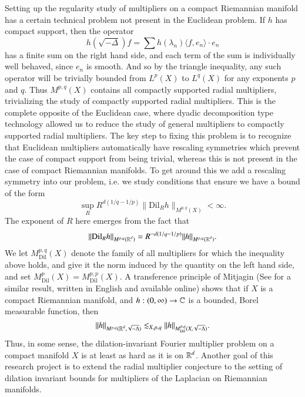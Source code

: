 Setting up the regularity study of multipliers on a compact Riemannian manifold has a certain technical problem not present in the Euclidean problem. If $h$ has compact support, then the operator
%
\[ h \left( \sqrt{-\Delta} \right) f = \sum h(\lambda_n) \langle f, e_n \rangle \cdot e_n \]
%
has a finite sum on the right hand side, and each term of the sum is individually well behaved, since $e_n$ is smooth. And so by the triangle inequality, any such operator will be trivially bounded from $L^p(X)$ to $L^q(X)$ for any exponents $p$ and $q$. Thus $M^{p,q}(X)$ contains all compactly supported radial multipliers, trivializing the study of compactly supported radial multipliers. This is the complete opposite of the Euclidean case, where dyadic decomposition type technology allowed us to reduce the study of general multipliers to compactly supported radial multipliers. The key step to fixing this problem is to recognize that Euclidean multipliers automatically have rescaling symmetries which prevent the case of compact support from being trivial, whereas this is not present in the case of compact Riemannian manifolds. To get around this we add a rescaling symmetry into our problem, i.e. we study conditions that ensure we have a bound of the form
%
\[ \sup_R R^{d(1/q - 1/p)} \| \text{Dil}_R h \|_{M^{p,q}(X)} < \infty. \]
%
The exponent of $R$ here emerges from the fact that
%
\[ \| \text{Dil}_R h \|_{M^{p,q}(\operatorname{\mathbb{R}}^d)} = R^{-d(1/q - 1/p)} \| h \|_{M^{p,q}(\operatorname{\mathbb{R}}^d)}. \]
%
We let $M^{p,q}_{\text{Dil}}(X)$ denote the family of all multipliers for which the inequality above holds, and give it the norm induced by the quantity on the left hand side, and set $M^p_{\text{Dil}}(X) = M^{p,p}_{\text{Dil}}(X)$. A transference principle of Mitjagin \cite{Mitjagin} (See \cite{KenigStantonTomas} for a similar result, written in English and available online) shows that if $X$ is a compact Riemannian manifold, and $h: (0,\infty) \to \operatorname{\mathbb{C}}$ is a bounded, Borel measurable function, then
%
\[ \| h \|_{M^{p,q}(\operatorname{\mathbb{R}}^d, \sqrt{-\Delta})} \lesssim_{X,p,q} \| h \|_{M^{p,q}_{\text{Dil}}(X, \sqrt{-\Delta})}. \]
%
Thus, in some sense, the dilation-invariant Fourier multiplier problem on a compact manifold $X$ is at least as hard as it is on $\operatorname{\mathbb{R}}^d$. Another goal of this research project is to extend the radial multiplier conjecture to the setting of dilation invariant bounds for multipliers of the Laplacian on Riemannian manifolds.

